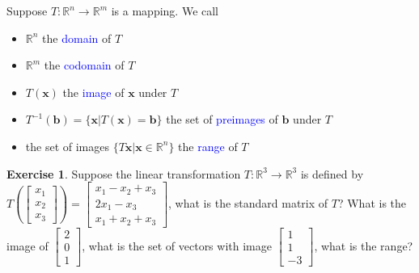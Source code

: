 \documentclass{beamer}
\theoremstyle{definition}
\newtheorem{exercise}[theorem]{Exercise}
\theoremstyle{remark}
\begin{document}
\begin{frame}[t]
\begin{definition}
Suppose $T:\mathbb R^n\to\mathbb R^m$ is a mapping. We call
\begin{itemize}
\item $\mathbb R^n$ the \textcolor{blue}{domain} of $T$\pause
\item $\mathbb R^m$ the \textcolor{blue}{codomain} of $T$\pause
\item $T(\mathbf x)$ the \textcolor{blue}{image} of $\mathbf x$ under $T$\pause
\item $T^{-1}(\mathbf b)=\{\mathbf x|T(\mathbf x)=\mathbf b\}$ the set of \textcolor{blue}{preimages} of $\mathbf b$ under $T$\pause
\item the set of images $\{T\mathbf x|\mathbf x\in\mathbb R^n\}$ the \textcolor{blue}{range} of $T$
\end{itemize}
\end{definition}
\pause
\begin{exercise}
Suppose the linear transformation $T:\mathbb R^3\to\mathbb R^3$ is defined by $T\left(\begin{bmatrix}
x_1\\x_2\\x_3
\end{bmatrix}\right)=\begin{bmatrix}
x_1-x_2+x_3\\ 2x_1-x_3\\ x_1+x_2+x_3
\end{bmatrix}$, what is the standard matrix of $T$? What is the image of $\begin{bmatrix}
2\\0\\1
\end{bmatrix}$, what is the set of vectors with image $\begin{bmatrix}
1\\1\\-3
\end{bmatrix}$, what is the range?
\end{exercise}
\end{frame}
\end{document}

